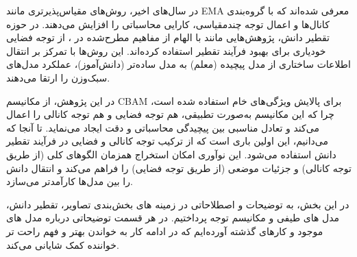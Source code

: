 در سال‌های اخیر، روش‌های مقیاس‌پذیرتری مانند EMA \cite{Ouyang_2023} معرفی شده‌اند که با گروه‌بندی کانال‌ها و اعمال توجه چندمقیاسی، کارایی محاسباتی را افزایش می‌دهند. در حوزه تقطیر دانش، پژوهش‌هایی مانند \cite{9678134} با الهام از مفاهیم مطرح‌شده در \cite{8953974}، از توجه فضایی خودیاری برای بهبود فرآیند تقطیر استفاده کرده‌اند. این روش‌ها با تمرکز بر انتقال اطلاعات ساختاری از مدل پیچیده (معلم) به مدل ساده‌تر (دانش‌آموز)، عملکرد مدل‌های سبک‌وزن را ارتقا می‌دهند.

در این پژوهش، از مکانیسم CBAM برای پالایش ویژگی‌های خام استفاده شده است، چرا که این مکانیسم به‌صورت تطبیقی، هم توجه فضایی و هم توجه کانالی را اعمال می‌کند و تعادل مناسبی بین پیچیدگی محاسباتی و دقت ایجاد می‌نماید. تا آنجا که می‌دانیم، این اولین باری است که از ترکیب توجه کانالی و فضایی در فرآیند تقطیر دانش استفاده می‌شود. این نوآوری امکان استخراج همزمان الگوهای کلی (از طریق توجه کانالی) و جزئیات موضعی (از طریق توجه فضایی) را فراهم می‌کند و انتقال دانش را بین مدل‌ها کارآمدتر می‌سازد.


در این بخش، به توضیحات و اصطلاحاتی در زمینه های بخش‌بندی تصاویر، تقطیر دانش، مدل های طیفی و مکانیسم توجه پرداختیم. در هر قسمت توضیحاتی درباره مدل های موجود و کارهای گذشته آورده‌ایم که در ادامه کار به خواندن بهتر و فهم راحت تر خواننده کمک شایانی می‌کند.

\newpage